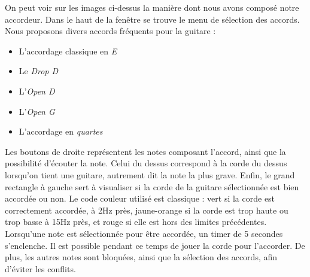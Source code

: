 On peut voir sur les images ci-dessus la manière dont nous avons composé notre accordeur. Dans le haut de la fenêtre se trouve le menu de sélection des accords. Nous proposons divers accords fréquents pour la guitare : 
\begin{itemize}
\item L'accordage classique en\textit{ E}
\item Le \textit{Drop D}
\item L'\textit{Open D}
\item L'\textit{Open G}
\item L'accordage en \textit{quartes}
\end{itemize}
Les boutons de droite représentent les notes composant l'accord, ainsi que la possibilité d'écouter la note. Celui du dessus correspond à la corde du dessus lorsqu'on tient une guitare, autrement dit la note la plus grave. Enfin, le grand rectangle à gauche sert à visualiser si la corde de la guitare sélectionnée est bien accordée ou non. Le code couleur utilisé est classique : vert si la corde est correctement accordée, à 2Hz près, jaune-orange si la corde est trop haute ou trop basse à 15Hz près, et rouge si elle est hors des limites précédentes.\\

Lorsqu'une note est sélectionnée pour être accordée, un timer de 5 secondes s'enclenche. Il est possible pendant ce temps de jouer la corde pour l'accorder. De plus, les autres notes sont bloquées, ainsi que la sélection des accords, afin d'éviter les conflits.
